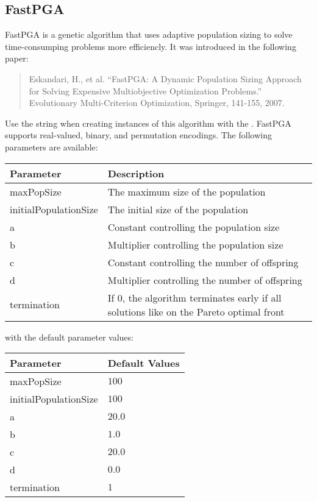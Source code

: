 \subsection{FastPGA}
FastPGA is a genetic algorithm that uses adaptive population sizing to solve time-consumping problems more efficiencly.  It was introduced in the following paper:
\begin{quote}
Eskandari, H., et al.  ``FastPGA: A Dynamic Population Sizing Approach for Solving Expensive Multiobjective Optimization Problems.''  Evolutionary Multi-Criterion Optimization, Springer, 141-155, 2007.
\end{quote}
Use the string  when creating instances of this algorithm with the .  FastPGA supports real-valued, binary, and permutation encodings.  The following parameters are available:
\newline
\newline
\begin{tabularx}{\linewidth}{lX}
  \hline
  Parameter & Description \\
  \hline
  maxPopSize & The maximum size of the population \\
  initialPopulationSize & The initial size of the population \\
  a & Constant controlling the population size \\
  b & Multiplier controlling the population size \\
  c & Constant controlling the number of offspring \\
  d & Multiplier controlling the number of offspring \\
  termination & If 0, the algorithm terminates early if all solutions like on the Pareto optimal front \\
  \hline
\end{tabularx}
\newline
\newline
with the default parameter values:
\newline
\newline
\begin{tabularx}{\linewidth}{lX}
  \hline
  Parameter & Default Values \\
  \hline
  maxPopSize & $100$ \\
  initialPopulationSize & $100$ \\
  a & $20.0$ \\
  b & $1.0$ \\
  c & $20.0$ \\
  d & $0.0$ \\
  termination & $1$ \\
  \hline
\end{tabularx}

